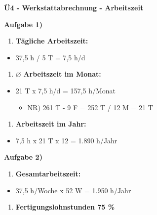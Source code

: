\textbf{Ü4 - Werkstattabrechnung - Arbeitszeit}

\textbf{Aufgabe 1)}

\begin{enumerate}
\def\labelenumi{\alph{enumi})}
\item
  \textbf{Tägliche Arbeitszeit:}
\end{enumerate}

\begin{itemize}
\item
  37,5 h / 5 T = 7,5 h/d
\end{itemize}

\begin{enumerate}
\def\labelenumi{\alph{enumi})}
\setcounter{enumi}{1}
\item
  $\varnothing$ \textbf{Arbeitszeit im Monat:}
\end{enumerate}

\begin{itemize}
\item
  21 T x 7,5 h/d = 157,5 h/Monat

  \begin{itemize}
  \item
    NR) 261 T - 9 F = 252 T / 12 M = 21 T
  \end{itemize}
\end{itemize}

\begin{enumerate}
\def\labelenumi{\alph{enumi})}
\setcounter{enumi}{2}
\item
  \textbf{Arbeitszeit im Jahr:}
\end{enumerate}

\begin{itemize}
\item
  7,5 h x 21 T x 12 = 1.890 h/Jahr
\end{itemize}

\textbf{Aufgabe 2)}

\begin{enumerate}
\def\labelenumi{\alph{enumi})}
\item
  \textbf{Gesamtarbeitszeit:}
\end{enumerate}

\begin{itemize}
\item
  37,5 h/Woche x 52 W = 1.950 h/Jahr
\end{itemize}

\begin{enumerate}
\def\labelenumi{\alph{enumi})}
\setcounter{enumi}{1}
\item
  \textbf{Fertigungslohnstunden 75 \%}
\end{enumerate}

